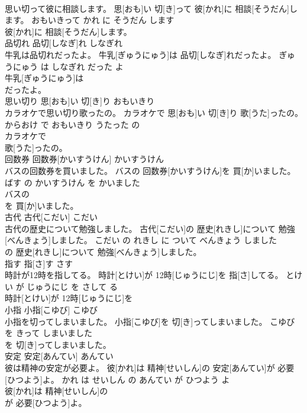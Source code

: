 \documentclass[8pt]{extreport}
\begin{document}
\begin{CJK}{UTF8}{min}
\\	思い切って彼に相談します。	思[おも]い 切[き]って 彼[かれ]に 相談[そうだん]します。	おもいきって かれ に そうだん します	
\\	彼[かれ]に 相談[そうだん]します。			
\\	品切れ	品切[しなぎ]れ	しなぎれ	
\\	牛乳は品切れだったよ。	牛乳[ぎゅうにゅう]は 品切[しなぎ]れだったよ。	ぎゅうにゅう は しなぎれ だった よ	
\\	牛乳[ぎゅうにゅう]は
\\	だったよ。			
\\	思い切り	思[おも]い 切[き]り	おもいきり	
\\	カラオケで思い切り歌ったの。	カラオケで 思[おも]い 切[き]り 歌[うた]ったの。	からおけ で おもいきり うたった の	
\\	カラオケで
\\	歌[うた]ったの。			
\\	回数券	回数券[かいすうけん]	かいすうけん	
\\	バスの回数券を買いました。	バスの 回数券[かいすうけん]を 買[か]いました。	ばす の かいすうけん を かいました	
\\	バスの
\\	を 買[か]いました。			
\\	古代	古代[こだい]	こだい	
\\	古代の歴史について勉強しました。	古代[こだい]の 歴史[れきし]について 勉強[べんきょう]しました。	こだい の れきし に ついて べんきょう しました	
\\	の 歴史[れきし]について 勉強[べんきょう]しました。			
\\	指す	指[さ]す	さす	
\\	時計が12時を指してる。	時計[とけい]が 12時[じゅうにじ]を 指[さ]してる。	とけい が じゅうにじ を さして る	
\\	時計[とけい]が 12時[じゅうにじ]を
\\	小指	小指[こゆび]	こゆび	
\\	小指を切ってしまいました。	小指[こゆび]を 切[き]ってしまいました。	こゆび を きって しまいました	
\\	を 切[き]ってしまいました。			
\\	安定	安定[あんてい]	あんてい	
\\	彼は精神の安定が必要よ。	彼[かれ]は 精神[せいしん]の 安定[あんてい]が 必要[ひつよう]よ。	かれ は せいしん の あんてい が ひつよう よ	
\\	彼[かれ]は 精神[せいしん]の
\\	が 必要[ひつよう]よ。			

\end{CJK}
\end{document}
